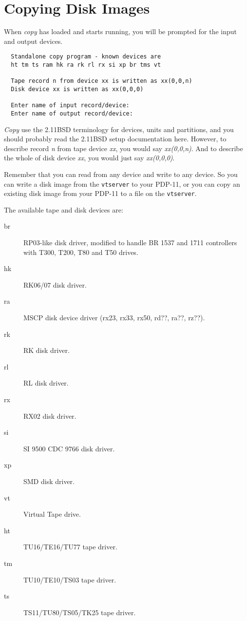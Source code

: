 \section{Copying Disk Images}

When {\it copy} has loaded and starts running, you will be prompted for the
input and output devices.

\begin{verbatim}
  Standalone copy program - known devices are 
  ht tm ts ram hk ra rk rl rx si xp br tms vt 

  Tape record n from device xx is written as xx(0,0,n)
  Disk device xx is written as xx(0,0,0)

  Enter name of input record/device:
  Enter name of output record/device:
\end{verbatim}

{\it Copy} use the 2.11BSD terminology for devices, units and partitions,
and you should probably read the 2.11BSD setup documentation here. However,
to describe record {\it n} from tape device {\it xx}, you would say
{\it xx(0,0,n)}. And to describe the whole of disk device {\it xx}, you would
just say {\it xx(0,0,0)}.

Remember that you can read from any device and write to any device. So you
can write a disk image from the {\tt vtserver} to your PDP-11, or you can
copy an existing disk image from your PDP-11 to a file on the {\tt vtserver}.

The available tape and disk devices are:

\begin{description}
\item[br] RP03-like disk driver, modified to handle BR 1537 and 1711
	controllers with T300, T200, T80 and T50 drives.
\item[hk] RK06/07 disk driver.
\item[ra] MSCP disk device driver (rx23, rx33, rx50, rd??, ra??, rz??).
\item[rk] RK disk driver.
\item[rl] RL disk driver.
\item[rx] RX02 disk driver.
\item[si] SI 9500 CDC 9766 disk driver.
\item[xp] SMD disk driver.

\item[vt] Virtual Tape drive.
\item[ht] TU16/TE16/TU77 tape driver.
\item[tm] TU10/TE10/TS03 tape driver.
\item[ts] TS11/TU80/TS05/TK25 tape driver.
\end{description}

